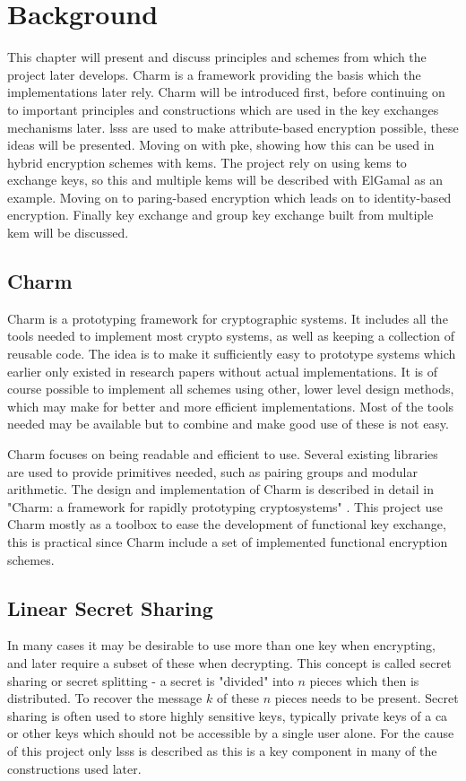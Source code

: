 \chapter{Background}
\label{chp:background} 
This chapter will present and discuss principles and schemes from which the project later develops. Charm is a framework providing the basis which the implementations later rely. Charm will be introduced first, before continuing on to important principles and constructions which are used in the key exchanges mechanisms later. \Gls{lsss} are used to make attribute-based encryption possible, these ideas will be presented. Moving on with \gls{pke}, showing how this can be used in hybrid encryption schemes with \glspl{kem}. The project rely on using \glspl{kem} to exchange keys, so this and multiple \glspl{kem} will be described with ElGamal as an example. Moving on to paring-based encryption which leads on to identity-based encryption. Finally key exchange and group key exchange built from multiple \gls{kem} will be discussed.

\section{Charm}
Charm \cite{DBLP:Charm13} is a prototyping framework for cryptographic systems. It includes all the tools needed to implement most crypto systems, as well as keeping a collection of reusable code. The idea is to make it sufficiently easy to prototype systems which earlier only existed in research papers without actual implementations. It is of course possible to implement all schemes using other, lower level design methods, which may make for better and more efficient implementations. Most of the tools needed may be available but to combine and make good use of these is not easy. 
\par Charm focuses on being readable and efficient to use. Several existing libraries are used to provide primitives needed, such as pairing groups and modular arithmetic. The design and implementation of Charm is described in detail in "Charm: a framework for rapidly prototyping cryptosystems" \cite{DBLP:Charm13}. This project use Charm mostly as a toolbox to ease the development of functional key exchange, this is practical since Charm include a set of implemented functional encryption schemes.


\section{Linear Secret Sharing}\label{subsec:lsss}
In many cases it may be desirable to use more than one key when encrypting, and later require a subset of these when decrypting. This concept is called secret sharing or secret splitting - a secret is "divided" into $n$ pieces which then is distributed. To recover the message $k$ of these $n$ pieces needs to be present. Secret sharing is often used to store highly sensitive keys, typically private keys of a \gls{ca} or other keys which should not be accessible by a single user alone. For the cause of this project only \gls{lsss} is described as this is a key component in many of the constructions used later. 


